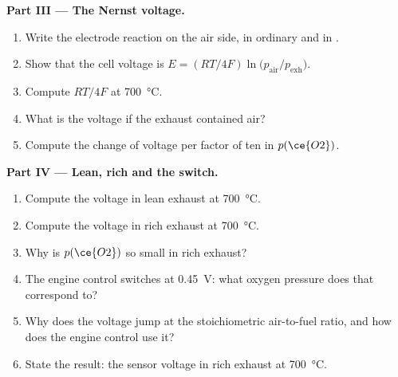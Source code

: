 \begin{problem}
\medskip\noindent\textbf{Part III --- The Nernst voltage.}
\begin{enumerate}[resume]
  \item Write the electrode reaction on the air side, in ordinary and in
        .
  \item Show that the cell voltage is $E = (RT/4F)\ln\bigl(p_{\mathrm{air}}/p_{\mathrm{exh}}\bigr)$.
  \item Compute $RT/4F$ at \qty{700}{\celsius}.
  \item What is the voltage if the exhaust contained air?
  \item Compute the change of voltage per factor of ten in $p(\ce{O2})$.
\end{enumerate}

\medskip\noindent\textbf{Part IV --- Lean, rich and the switch.}
\begin{enumerate}[resume]
  \item Compute the voltage in lean exhaust at \qty{700}{\celsius}.
  \item Compute the voltage in rich exhaust at \qty{700}{\celsius}.
  \item Why is $p(\ce{O2})$ so small in rich exhaust?
  \item The engine control switches at \qty{0.45}{V}: what oxygen pressure does that
        correspond to?
  \item Why does the voltage jump at the stoichiometric air-to-fuel ratio, and how
        does the engine control use it?
  \item State the result: the sensor voltage in rich exhaust at \qty{700}{\celsius}.
\end{enumerate}
\end{problem}
